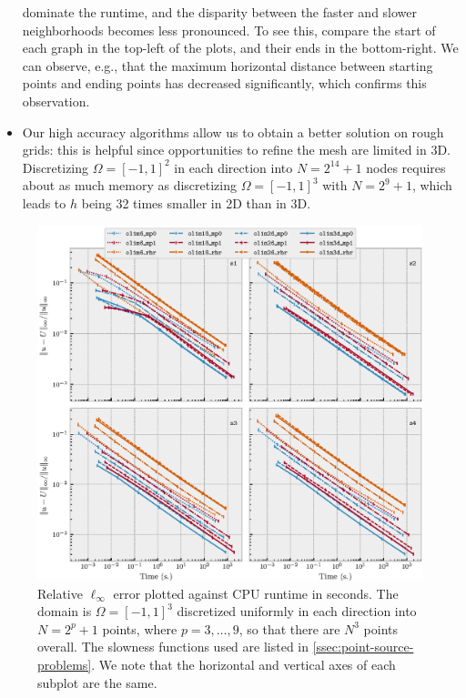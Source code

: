 \documentclass[sisc-eikonal.tex]{subfiles}
\begin{document}
\begin{itemize}
  dominate the runtime, and the disparity between the faster and
  slower neighborhoods becomes less pronounced. To see this, compare
  the start of each graph in the top-left of the plots, and their ends
  in the bottom-right. We can observe, e.g., that the maximum
  horizontal distance between starting points and ending points has
  decreased significantly, which confirms this observation.
\item Our high accuracy algorithms allow us to obtain a better
  solution on rough grids: this is helpful since opportunities to
  refine the mesh are limited in 3D. Discretizing $\Omega = [-1, 1]^2$
  in each direction into $N = 2^{14} + 1$ nodes requires about as much
  memory as discretizing $\Omega = [-1, 1]^3$ with $N = 2^{9} + 1$,
  which leads to $h$ being 32 times smaller in 2D than in 3D.
\end{itemize}

\begin{figure}
  \centering \includegraphics[width=\linewidth]{time_vs_error_3d.eps}
  \caption{Relative $\ell_\infty$ error plotted against CPU runtime in
    seconds. The domain is $\Omega = [-1, 1]^3$ discretized uniformly
    in each direction into $N = 2^p + 1$ points, where
    $p = 3, \hdots, 9$, so that there are $N^3$ points overall. The
    slowness functions used are listed in
    \cref{ssec:point-source-problems}. We note that the horizontal and
    vertical axes of each subplot are the
    same.}\label{fig:time-vs-error}
\end{figure}
\end{document}
